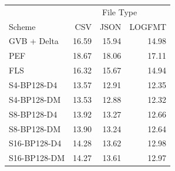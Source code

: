 \begin{tabular}{lrrr}
\toprule
 & \multicolumn{3}{c}{File Type} \\
Scheme & CSV & JSON & LOGFMT \\
\midrule
GVB + Delta & 16.59 & 15.94 & 14.98 \\
PEF & 18.67 & 18.06 & 17.11 \\
FLS & 16.32 & 15.67 & 14.94 \\
S4-BP128-D4 & 13.57 & 12.91 & 12.35 \\
S4-BP128-DM & 13.53 & 12.88 & 12.32 \\
S8-BP128-D4 & 13.92 & 13.27 & 12.66 \\
S8-BP128-DM & 13.90 & 13.24 & 12.64 \\
S16-BP128-D4 & 14.28 & 13.62 & 12.98 \\
S16-BP128-DM & 14.27 & 13.61 & 12.97 \\
\bottomrule
\end{tabular}
